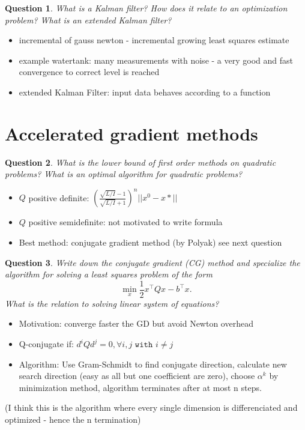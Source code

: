 \documentclass{article}
\newtheorem{question}{Question}
\newcommand{\T}[1]{#1^{\top}}
\begin{document}
\begin{question}
  What is a Kalman filter? How does it relate to an optimization problem?  What is an extended
  Kalman filter?
\end{question}
\begin{itemize}
\item incremental of gauss newton - incremental growing least squares estimate
\item example watertank: many measurements with noise - a very good and fast convergence to correct
  level is reached
\item extended Kalman Filter: input data behaves according to a function
\end{itemize}

\section{Accelerated gradient methods}

\begin{question}
  What is the lower bound of first order methods on quadratic problems?  What is an optimal
  algorithm for quadratic problems?
\end{question}
\begin{itemize}
\item $Q$ positive definite: $\left(\frac{\sqrt{L/I}-1}{\sqrt{L/I} + 1}\right)^n || x^0  - x* ||$
\item $Q$ positive semidefinite: not motivated to write formula
\item Best method: conjugate gradient method (by Polyak) see next question
\end{itemize}

\begin{question}
  Write down the conjugate gradient (CG) method and specialize the algorithm for solving a least
  squares problem of the form
  \[
    \min_x \frac{1}{2} \T{x} Q x - \T{b} x.
  \]
  What is the relation to solving linear system of equations?
\end{question}
\begin{itemize}
\item Motivation: converge faster the GD but avoid Newton overhead
\item Q-conjugate if: $d^i  Q d^j = 0, \forall i, j \texttt{ with } i \neq j$
\item Algorithm: Use Gram-Schmidt to find conjugate direction, calculate new search direction (easy
  as all but one coefficient are zero), choose $\alpha^k$ by minimization method, algorithm
  terminates after at most n steps.
\end{itemize}
(I think this is the algorithm where every single dimension is differenciated and optimized - hence
the n termination)
\end{document}
